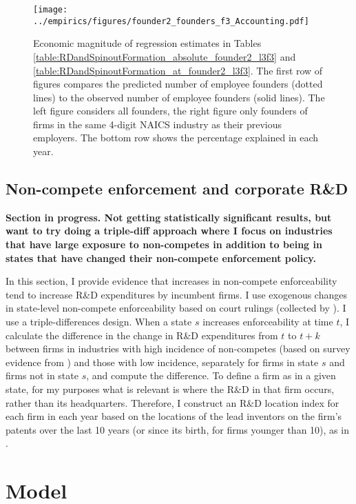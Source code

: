 \documentclass[12pt,english]{article}
\theoremstyle{remark}
\begin{document}
\begin{figure}[!htb]
	\texttt{[image: ../empirics/figures/founder2\_founders\_f3\_Accounting.pdf]}
	\caption{Economic magnitude of regression estimates in Tables \ref{table:RDandSpinoutFormation_absolute_founder2_l3f3} and \ref{table:RDandSpinoutFormation_at_founder2_l3f3}. The first row of figures compares the predicted number of employee founders (dotted lines) to the observed number of employee founders (solid lines). The left figure considers all founders, the right figure only founders of firms in the same 4-digit NAICS industry as their previous employers. The bottom row shows the percentage explained in each year.}
	\label{figure:founder2_founders_f3_Accounting.pdf}
\end{figure}

\subsection{Non-compete enforcement and corporate R\&D}

\textbf{Section in progress. Not getting statistically significant results, but want to try doing a triple-diff approach where I focus on industries that have large exposure to non-competes in addition to being in states that have changed their non-compete enforcement policy.}

In this section, I provide evidence that increases in non-compete enforceability tend to increase R\&D expenditures by incumbent firms. I use exogenous changes in state-level non-compete enforceability based on court rulings (collected by \cite{jeffers_impact_2018}). I use a triple-differences design. When a state $s$ increases enforceability at time $t$, I calculate the difference in the change in R\&D expenditures from $t$ to $t+k$ between firms in industries with high incidence of non-competes (based on survey evidence from \cite{starr_noncompetes_2019}) and those with low incidence, separately for firms in state $s$ and firms not in state $s$, and compute the difference. To define a firm as in a given state, for my purposes what is relevant is where the R\&D in that firm occurs, rather than its headquarters. Therefore, I construct an R\&D location index for each firm in each year based on the locations of the lead inventors on the firm's patents over the last 10 years (or since its birth, for firms younger than 10), as in \cite{bloom_identifying_2013}. 


\section{Model}
\end{document}
